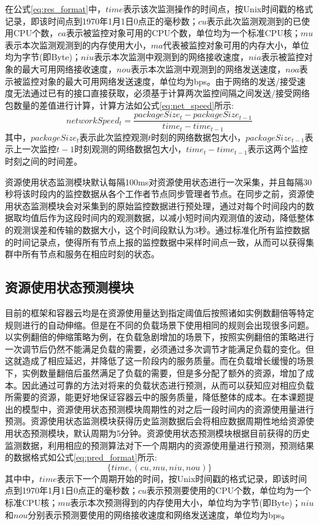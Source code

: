 在公式\ref{eq:res_format}中，$time$表示该次监测操作的时间点，按Unix时间戳的格式记录，即该时间点到1970年1月1日0点正的毫秒数；$cu$表示此次监测观测到的已使用CPU个数，$ca$表示被监控对象可用的CPU个数，单位均为一个标准CPU核；$mu$表示本次监测观测到的内存使用大小，$ma$代表被监控对象可用的内存大小，单位均为字节(即Byte)；$niu$表示本次监测中观测到的网络接收速度，$nia$表示被监控对象的最大可用网络接收速度，$nou$表示本次监测中观测到的网络发送速度，$noa$表示被监控对象的最大可用网络发送速度，单位均为bps。由于网络的发送/接受速度无法通过已有的接口直接获取，必须基于计算两次监控间隔之间发送/接受网络包数量的差值进行计算，计算方法如公式\ref{eq:net_speed}所示:
\begin{equation}\label{eq:net_speed}
networkSpeed_t = \frac{packageSize_t-packageSize_{t-1}}{time_t-time_{t-1}}
\end{equation}
其中，$packageSize_t$表示此次监控观测$t$时刻的网络数据包大小，$packageSize_{t-1}$表示上一次监控${t-1}$时刻观测的网络数据包大小，$time_t-time_{t-1}$表示这两个监控时刻之间的时间差。

资源使用状态监测模块默认每隔100ms对资源使用状态进行一次采集，并且每隔30秒将该时段内的监控数据从各个工作者节点同步管理者节点。在同步之前，资源使用状态监测模块会对采集到的原始监控数据进行预处理，通过对每个时间段内的数据取均值后作为这段时间内的观测数据，以减小短时间内观测值的波动，降低整体的观测误差和传输的数据大小，这个时间段默认为3秒。通过标准化所有监控数据的时间记录点，使得所有节点上报的监控数据中采样时间点一致，从而可以获得集群中所有节点和服务在相应时刻的状态。

\subsection{资源使用状态预测模块}\label{sec:prediction}
目前的框架和容器云均是在资源使用量达到指定阈值后按照诸如实例数翻倍等特定规则进行的自动伸缩。但是在不同的负载场景下使用相同的规则会出现很多问题。以实例翻倍的伸缩策略为例，在负载急剧增加的场景下，按照实例翻倍的策略进行一次调节后仍然不能满足负载的需要，必须通过多次调节才能满足负载的变化。但这就造成了相应延迟，并降低了这一阶段内的服务质量。而在负载增长缓慢的场景下，实例数量翻倍后虽然满足了负载的需要，但是多分配了额外的资源，增加了成本。因此通过可靠的方法对将来的负载状态进行预测，从而可以获知应对相应负载所需要的资源，能更好地保证容器云中的服务质量，降低整体的成本。在本课题提出的模型中，资源使用状态预测模块周期性的对之后一段时间内的资源使用量进行预测。资源使用状态监测模块获得历史监测数据后会将相应数据周期性地给资源使用状态预测模块，默认周期为5分钟。资源使用状态预测模块根据目前获得的历史监测数据，利用相应的预测算法对下一个周期内的资源使用量进行预测，预测结果的数据格式如公式\ref{eq:pred_format}所示:
\begin{equation}\label{eq:pred_format}
\{time, (cu, mu, niu, nou)\}
\end{equation}
其中中，$time$表示下一个周期开始的时间，按Unix时间戳的格式记录，即该时间点到1970年1月1日0点正的毫秒数；$cu$表示预测要使用的CPU个数，单位均为一个标准CPU核；$mu$表示本次预测得到的内存使用大小，单位均为字节(即Byte)；$niu$和$nou$分别表示预测要使用的网络接收速度和网络发送速度，单位均为bps。

